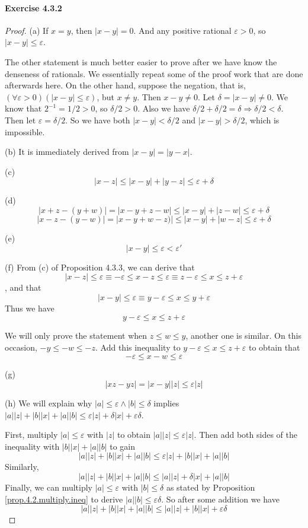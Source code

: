\paragraph{Exercise 4.3.2} \label{exercise4.3.2}
\begin{proof}
(a)
If $x=y$, then $|x-y| = 0$. And any positive rational $\varepsilon >0$, so $|x-y|\leq\varepsilon$.

The other statement is much better easier to prove after we have know the denseness of rationals. We 
essentially repeat some of the proof work that are done afterwards here.
On the other hand, suppose the negation, that is, $(\forall \varepsilon>0)(|x-y| \leq \varepsilon)$, but 
$x\neq y$. Then $x-y \neq 0$. Let $\delta = |x-y| \neq 0$. We know that $2^{-1} = 1/2 > 0$, so 
$\delta / 2 > 0$. Also we have $\delta /2 + \delta /2 = \delta \Longrightarrow \delta /2 < \delta$. Then let 
$\varepsilon = \delta /2$. So we have both $|x-y| < \delta/2$ and $|x-y| > \delta /2$, which is impossible. 

(b)
It is immediately derived from $|x-y| = |y-x|$.

(c)
\[
|x-z| \leq |x-y| + |y-z| \leq \varepsilon + \delta
\]

(d)
\[
|x+z - (y+w)| = |x-y + z-w| \leq |x-y| + |z-w| \leq \varepsilon + \delta
\]
\[
|x-z - (y-w)| = |x-y + w-z)| \leq |x-y| + |w-z| \leq \varepsilon + \delta
\]

(e)
\[
|x-y| \leq \varepsilon < \varepsilon'
\]

(f)
From (c) of Proposition 4.3.3, we can derive that
\[
|x-z| \leq \varepsilon \equiv -\varepsilon \leq x-z \leq \varepsilon 
\equiv z-\varepsilon \leq x \leq z+ \varepsilon
\]
, and that
\[
|x-y| \leq \varepsilon \equiv y-\varepsilon \leq x \leq y + \varepsilon
\]
Thus we have
\[
y-\varepsilon \leq x \leq z + \varepsilon
\]

We will only prove the statement when $z\leq w \leq y$, another one is similar. On this occasion, 
$-y \leq -w \leq -z$. Add this inequality to $y-\varepsilon \leq x \leq z + \varepsilon$ to obtain that 
\[
-\varepsilon \leq x-w \leq \varepsilon
\]

(g)
\[
|xz-yz| = |x-y||z| \leq \varepsilon|z|
\]

(h)
We will explain why $|a| \leq \varepsilon \wedge |b| \leq \delta$ implies 
$|a||z| + |b||x| + |a||b| \leq \varepsilon|z| + \delta|x| + \varepsilon\delta$.

First, multiply $|a| \leq \varepsilon$ with $|z|$ to obtain $|a||z| \leq \varepsilon |z|$. Then add both sides 
of the inequality with $|b||x| + |a||b|$ to gain 
\[
|a||z| + |b||x| + |a||b| \leq \varepsilon |z| + |b||x| + |a||b| \tag{1}
\]
Similarly,
\[
|a||z| + |b||x| + |a||b| \leq |a||z| + \delta |x| + |a||b| \tag{2}
\]
Finally, we can multiply $|a| \leq \varepsilon$ with $|b| \leq \delta$ as stated by Proposition 
\ref{prop.4.2.multiply.ineq} to derive $|a||b| \leq \varepsilon\delta$. So after some addition we have
\[
|a||z| + |b||x| + |a||b| \leq |a||z| + |b||x| + \varepsilon\delta \tag{3}
\]


\end{proof}

